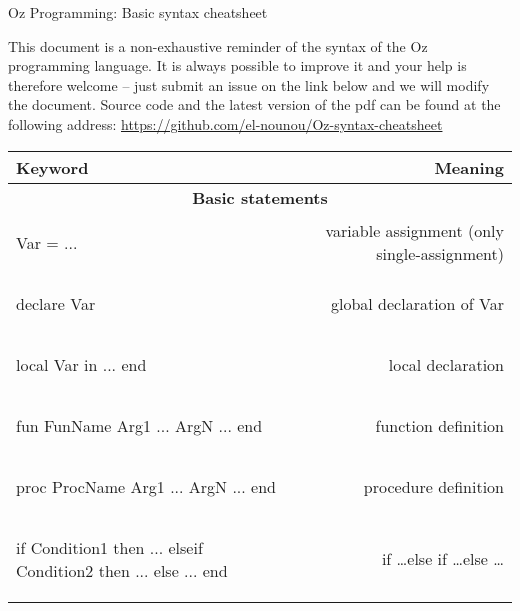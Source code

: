 \documentclass[12pt]{article}
\author{Felten Florian}
\begin{document}
\vspace*{2em}
\begin{center} %
	{\Large Oz Programming: Basic syntax cheatsheet}
\end{center}

This document is a non-exhaustive reminder of the syntax of the Oz programming language. It is always possible to improve it and your help is therefore welcome -- just submit an issue on the link below and we will modify the document. Source code and the latest version of the pdf can be found at the following address:
\url{https://github.com/el-nounou/Oz-syntax-cheatsheet}

\renewcommand*{\arraystretch}{1.5}
\begin{longtable}{l r}
\toprule[0.2em]
\multicolumn{1}{l}{\textbf{Keyword}} & \textbf{Meaning}\\
\midrule[0.3mm]


\multicolumn{2}{c}{\textbf{Basic statements}}\\
\midrule[0.3mm]

\begin{oz}
Var = ...
\end{oz}
&variable assignment (only single-assignment)\\
\hline

\begin{oz}
declare Var 
\end{oz}
&global declaration of Var\\
\hline
 
\begin{oz}
local Var in 
  ...
end
\end{oz}
&local declaration\\
\hline
 
 
\begin{oz}
fun {FunName Arg1 ... ArgN}
  ...
end
\end{oz}
&function definition\\
\hline
 
\begin{oz}
proc {ProcName Arg1 ... ArgN}
  ...
end
\end{oz}
&procedure definition\\
\hline

\begin{oz}
if Condition1 then ...
elseif Condition2 then ...
else ...
end
\end{oz}
&if \dots else if \dots else \dots \\
\hline
 

\end{longtable}
\end{document}
